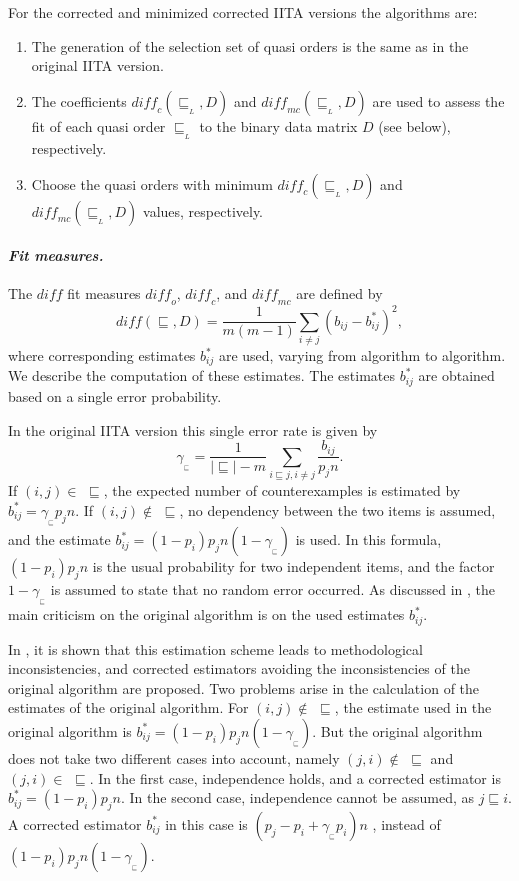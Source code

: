 \documentclass[nojss]{jss}
\begin{document}
For the corrected and minimized corrected IITA versions \citep{SU:09} the algorithms are:
\begin{enumerate}
\item The generation of the selection set of quasi orders is the same as in the original IITA version.
\item The coefficients $\mathit{diff_c}(\sqsubseteq_{_L}, D)$ and $\mathit{diff_{mc}}(\sqsubseteq_{_L}, D)$ are 
used to assess the fit of each quasi order $\sqsubseteq_{_L}$ to the binary data matrix $D$ (see below), respectively.
\item Choose the quasi orders with minimum $\mathit{diff_c}(\sqsubseteq_{_L}, D)$ and 
$\mathit{diff_{mc}}(\sqsubseteq_{_L}, D)$ values, respectively.
\end{enumerate}

\paragraph{\it Fit measures.}
The $\mathit{diff}$ fit measures $\mathit{diff_o}$,  $\mathit{diff_c}$, and  $\mathit{diff_{mc}}$ 
are defined by
\begin{displaymath}
\mathit{diff} (\sqsubseteq, D) = \frac{1}{m(m-1)}\sum_{i \not= j} (b_{ij} - b^*_{ij})^2,
\end{displaymath}
where corresponding estimates $b^*_{ij}$ are used, varying from algorithm to algorithm.
We describe the computation of these estimates.
The estimates $b^*_{ij}$ are obtained based on a single error probability.

In the original IITA version this single error rate is given by
\[
\gamma_{_\sqsubseteq}=\frac{1}{|\!\sqsubseteq\!| - m}\sum\limits_{i \sqsubseteq j, i \not= j} \frac{b_{ij}}{p_{j} n}.
\]
If $(i,j)\in \,\,\sqsubseteq$, 
the expected number of counterexamples is estimated by 
$b^*_{ij} = \gamma_{_\sqsubseteq} p_j n$. 
If $(i,j)\not \in \,\,\sqsubseteq$, no dependency between the two items is assumed, 
and the estimate $b^*_{ij} = (1-p_i) p_j n (1-\gamma_{_\sqsubseteq})$ is used. 
In this formula, $(1-p_i) p_j n$ is the usual probability for two independent items, 
and the factor $1-\gamma_{_\sqsubseteq}$ is assumed to state that no random error occurred. 
As discussed in \cite{SU:09}, the main criticism on the original algorithm is on the used 
estimates $b^*_{ij}$. 

In \cite{SU:09}, it is shown that this estimation scheme leads to 
methodological inconsistencies, and corrected estimators avoiding the inconsistencies 
of the original algorithm are proposed.
Two problems arise in the calculation of the estimates of the original
algorithm. For $(i,j) \not\in \,\, \sqsubseteq$, the estimate used in the original algorithm 
is $b^*_{ij} = (1-p_i) p_j n (1-\gamma_{_\sqsubseteq})$. But the original algorithm does not 
take two different cases into account, namely $(j,i) \not\in \,\, \sqsubseteq$ 
and $(j,i) \in \,\, \sqsubseteq$. In the first case, independence holds, 
and a corrected estimator is $b^*_{ij} = (1-p_i) p_j n$. 
In the second case, independence cannot be assumed, as $j \sqsubseteq i$. 
A corrected estimator $b^*_{ij}$ in this case is $(p_j - p_i + \gamma_{_\sqsubseteq}p_i) n$
\citep[see][]{SU:09}, instead of $(1-p_i) p_j n (1-\gamma_{_\sqsubseteq})$.
\end{document}
